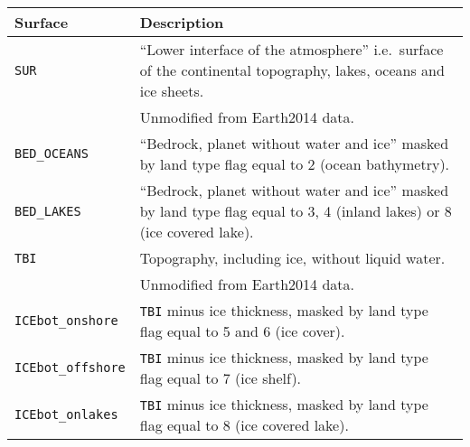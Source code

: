 \begingroup\setlength{\fboxsep}{0pt}
\colorbox{tablebackground}{%
\begin{tabular}{lp{}}
    \toprule   
    \textbf{Surface} & \textbf{Description} \\
    \midrule
    \texttt{SUR} &
    ``Lower interface of the atmosphere'' i.e.~surface of the continental topography, lakes, oceans and ice sheets. \\
    & Unmodified from Earth2014 data. \\
    \texttt{BED\_OCEANS} &
    ``Bedrock, planet without water and ice'' masked by land type flag equal to 2 (ocean bathymetry). \\
    \texttt{BED\_LAKES} &
    ``Bedrock, planet without water and ice'' masked by land type flag equal to 3, 4 (inland lakes) or 8 (ice covered lake). \\
    \texttt{TBI} &
    Topography, including ice, without liquid water. \\
    & Unmodified from Earth2014 data. \\
    \texttt{ICEbot\_onshore} &
    \texttt{TBI} minus ice thickness, masked by land type flag equal to 5 and 6 (ice cover). \\
    \texttt{ICEbot\_offshore} &
    \texttt{TBI} minus ice thickness, masked by land type flag equal to 7 (ice shelf).  \\
    \texttt{ICEbot\_onlakes} &
    \texttt{TBI} minus ice thickness, masked by land type flag equal to 8 (ice covered lake).  \\
    \bottomrule
\end{tabular}
}\endgroup
